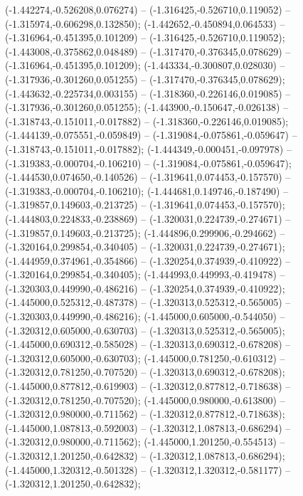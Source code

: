 (-1.442274,-0.526208,0.076274) -- (-1.316425,-0.526710,0.119052) -- (-1.315974,-0.606298,0.132850);
 (-1.442652,-0.450894,0.064533) -- (-1.316964,-0.451395,0.101209) -- (-1.316425,-0.526710,0.119052);
 (-1.443008,-0.375862,0.048489) -- (-1.317470,-0.376345,0.078629) -- (-1.316964,-0.451395,0.101209);
 (-1.443334,-0.300807,0.028030) -- (-1.317936,-0.301260,0.051255) -- (-1.317470,-0.376345,0.078629);
 (-1.443632,-0.225734,0.003155) -- (-1.318360,-0.226146,0.019085) -- (-1.317936,-0.301260,0.051255);
 (-1.443900,-0.150647,-0.026138) -- (-1.318743,-0.151011,-0.017882) -- (-1.318360,-0.226146,0.019085);
 (-1.444139,-0.075551,-0.059849) -- (-1.319084,-0.075861,-0.059647) -- (-1.318743,-0.151011,-0.017882);
 (-1.444349,-0.000451,-0.097978) -- (-1.319383,-0.000704,-0.106210) -- (-1.319084,-0.075861,-0.059647);
 (-1.444530,0.074650,-0.140526) -- (-1.319641,0.074453,-0.157570) -- (-1.319383,-0.000704,-0.106210);
 (-1.444681,0.149746,-0.187490) -- (-1.319857,0.149603,-0.213725) -- (-1.319641,0.074453,-0.157570);
 (-1.444803,0.224833,-0.238869) -- (-1.320031,0.224739,-0.274671) -- (-1.319857,0.149603,-0.213725);
 (-1.444896,0.299906,-0.294662) -- (-1.320164,0.299854,-0.340405) -- (-1.320031,0.224739,-0.274671);
 (-1.444959,0.374961,-0.354866) -- (-1.320254,0.374939,-0.410922) -- (-1.320164,0.299854,-0.340405);
 (-1.444993,0.449993,-0.419478) -- (-1.320303,0.449990,-0.486216) -- (-1.320254,0.374939,-0.410922);
 (-1.445000,0.525312,-0.487378) -- (-1.320313,0.525312,-0.565005) -- (-1.320303,0.449990,-0.486216);
 (-1.445000,0.605000,-0.544050) -- (-1.320312,0.605000,-0.630703) -- (-1.320313,0.525312,-0.565005);
 (-1.445000,0.690312,-0.585028) -- (-1.320313,0.690312,-0.678208) -- (-1.320312,0.605000,-0.630703);
 (-1.445000,0.781250,-0.610312) -- (-1.320312,0.781250,-0.707520) -- (-1.320313,0.690312,-0.678208);
 (-1.445000,0.877812,-0.619903) -- (-1.320312,0.877812,-0.718638) -- (-1.320312,0.781250,-0.707520);
 (-1.445000,0.980000,-0.613800) -- (-1.320312,0.980000,-0.711562) -- (-1.320312,0.877812,-0.718638);
 (-1.445000,1.087813,-0.592003) -- (-1.320312,1.087813,-0.686294) -- (-1.320312,0.980000,-0.711562);
 (-1.445000,1.201250,-0.554513) -- (-1.320312,1.201250,-0.642832) -- (-1.320312,1.087813,-0.686294);
 (-1.445000,1.320312,-0.501328) -- (-1.320312,1.320312,-0.581177) -- (-1.320312,1.201250,-0.642832);
